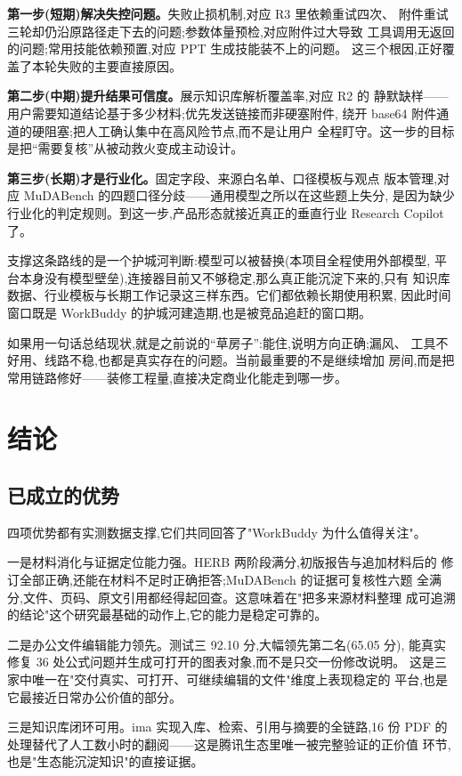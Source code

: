\documentclass[
  12pt,
  a4paper,
  oneside,
  headings=normal,
  numbers=noendperiod,
  listof=totoc,
  bibliography=totoc
]{scrreprt}
\begin{document}
\textbf{第一步(短期)解决失控问题。}失败止损机制,对应 R3 里依赖重试四次、
附件重试三轮却仍沿原路径走下去的问题;参数体量预检,对应附件过大导致
工具调用无返回的问题;常用技能依赖预置,对应 PPT 生成技能装不上的问题。
这三个根因,正好覆盖了本轮失败的主要直接原因。

\textbf{第二步(中期)提升结果可信度。}展示知识库解析覆盖率,对应 R2 的
静默缺样——用户需要知道结论基于多少材料;优先发送链接而非硬塞附件,
绕开 base64 附件通道的硬阻塞;把人工确认集中在高风险节点,而不是让用户
全程盯守。这一步的目标是把“需要复核”从被动救火变成主动设计。

\textbf{第三步(长期)才是行业化。}固定字段、来源白名单、口径模板与观点
版本管理,对应 MuDABench 的四题口径分歧——通用模型之所以在这些题上失分,
是因为缺少行业化的判定规则。到这一步,产品形态就接近真正的垂直行业
Research Copilot 了。

支撑这条路线的是一个护城河判断:模型可以被替换(本项目全程使用外部模型,
平台本身没有模型壁垒),连接器目前又不够稳定,那么真正能沉淀下来的,只有
知识库数据、行业模板与长期工作记录这三样东西。它们都依赖长期使用积累,
因此时间窗口既是 WorkBuddy 的护城河建造期,也是被竞品追赶的窗口期。

如果用一句话总结现状,就是之前说的“草房子”:能住,说明方向正确;漏风、
工具不好用、线路不稳,也都是真实存在的问题。当前最重要的不是继续增加
房间,而是把常用链路修好——装修工程量,直接决定商业化能走到哪一步。

\chapter{结论}

\section{已成立的优势}

四项优势都有实测数据支撑,它们共同回答了"WorkBuddy 为什么值得关注"。

一是材料消化与证据定位能力强。HERB 两阶段满分,初版报告与追加材料后的
修订全部正确,还能在材料不足时正确拒答;MuDABench 的证据可复核性六题
全满分,文件、页码、原文引用都经得起回查。这意味着在"把多来源材料整理
成可追溯的结论"这个研究最基础的动作上,它的能力是稳定可靠的。

二是办公文件编辑能力领先。测试三 92.10 分,大幅领先第二名(65.05 分),
能真实修复 36 处公式问题并生成可打开的图表对象,而不是只交一份修改说明。
这是三家中唯一在"交付真实、可打开、可继续编辑的文件"维度上表现稳定的
平台,也是它最接近日常办公价值的部分。

三是知识库闭环可用。ima 实现入库、检索、引用与摘要的全链路,16 份 PDF
的处理替代了人工数小时的翻阅——这是腾讯生态里唯一被完整验证的正价值
环节,也是"生态能沉淀知识"的直接证据。
\end{document}
